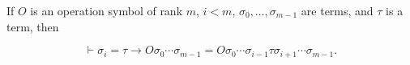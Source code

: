 If $O$ is an operation symbol of rank $m$, $i < m$, $\sigma_0, \ldots, \sigma_{m-1}$ are terms, and $\tau$ is a term, then

$$\vdash \sigma_i = \tau \rightarrow O \sigma_0 \cdots \sigma_{m-1} = O \sigma_0 \cdots \sigma_{i-1} \tau \sigma_{i+1} \cdots \sigma_{m-1}.$$
